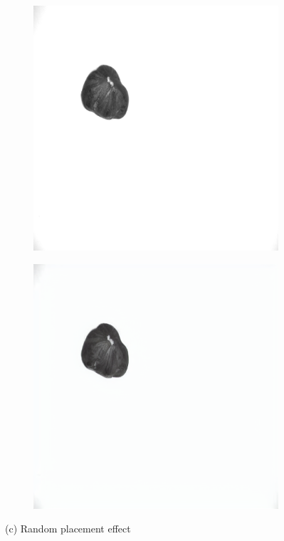\documentclass[12pt,DIV14,BCOR12mm,a4paper,footinclude=false,headinclude,parskip=half-,twoside,openright,cleardoublepage=empty,toc=index,bibliography=totoc,listof=totoc]{scrreprt}
\numberwithin{equation}{chapter}
\begin{document}
\begin{figure}
    \vspace{0.3cm} %

    \begin{subfigure}[t]{0.24\textwidth}
        \centering
        \includegraphics[width=\textwidth]{../media/diff_nuts_random_real.png}
    \end{subfigure}%
    \hspace{0.02\textwidth}
    \begin{subfigure}[t]{0.24\textwidth}
        \centering
        \includegraphics[width=\textwidth]{../media/diff_nuts_random_fake.png}
    \end{subfigure}
    \caption*{(c) Random placement effect}


\end{figure}
\end{document}
